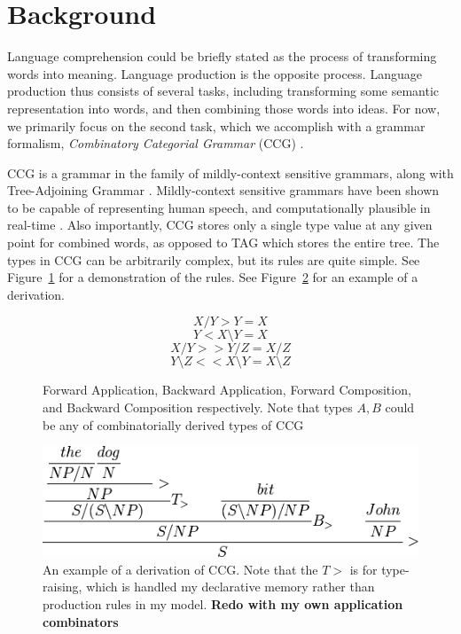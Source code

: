 \section{Background}\label{sec:ccg}
Language comprehension could be briefly stated as the process of transforming words into meaning. Language production is the opposite process. Language production thus consists of several tasks, including transforming some semantic representation into words, and then combining those words into ideas. For now, we primarily focus on the second task, which we accomplish with a grammar formalism, \textit{Combinatory Categorial Grammar} (CCG) \citep{ccg}.

CCG is a grammar in the family of mildly-context sensitive grammars, along with Tree-Adjoining Grammar \citep{tag}. Mildly-context sensitive grammars have been shown to be capable of representing human speech, and computationally plausible in real-time \citep{convergence}. Also importantly, CCG stores only a single type value at any given point for combined words, as opposed to TAG which stores the entire tree. The types in CCG can be arbitrarily complex, but its rules are quite simple. See Figure~\ref{eqn:ccg} for a demonstration of the rules. See Figure~\ref{fig:ccg} for an example of a derivation.

\begin{figure}
\[X/Y > Y = X\]
\[Y < X\setminus Y = X\]
\[X/Y >> Y/Z = X/Z\]
\[Y\setminus Z << X\setminus Y = X\setminus Z\]
\caption{Forward Application, Backward Application, Forward Composition, and Backward Composition respectively. Note that types $A,B$ could be any of combinatorially derived types of CCG}
\label{eqn:ccg}
\end{figure}

\begin{figure}[ht]
\begin{center}
\includegraphics[width=0.95\columnwidth]{figures/ccg}
\end{center}
\caption{An example of a derivation of CCG. Note that the $T>$ is for type-raising, which is handled my declarative memory rather than production rules in my model. \textbf{Redo with my own application combinators}}  
\label{fig:ccg}
\end{figure}

